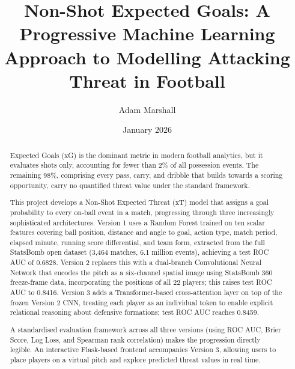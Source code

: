 \documentclass{article}
\title{Non-Shot Expected Goals: A Progressive Machine Learning Approach to Modelling Attacking Threat in Football}
\author{Adam Marshall}
\date{January 2026}
\begin{document}
\maketitle

\begin{abstract}
Expected Goals (xG) is the dominant metric in modern football analytics, but it evaluates shots only, accounting for fewer than 2\% of all possession events. The remaining 98\%, comprising every pass, carry, and dribble that builds towards a scoring opportunity, carry no quantified threat value under the standard framework.

This project develops a Non-Shot Expected Threat (xT) model that assigns a goal probability to every on-ball event in a match, progressing through three increasingly sophisticated architectures. Version 1 uses a Random Forest trained on ten scalar features covering ball position, distance and angle to goal, action type, match period, elapsed minute, running score differential, and team form, extracted from the full StatsBomb open dataset (3,464 matches, 6.1 million events), achieving a test ROC AUC of 0.6828. Version 2 replaces this with a dual-branch Convolutional Neural Network that encodes the pitch as a six-channel spatial image using StatsBomb 360 freeze-frame data, incorporating the positions of all 22 players; this raises test ROC AUC to 0.8416. Version 3 adds a Transformer-based cross-attention layer on top of the frozen Version 2 CNN, treating each player as an individual token to enable explicit relational reasoning about defensive formations; test ROC AUC reaches 0.8459.

A standardised evaluation framework across all three versions (using ROC AUC, Brier Score, Log Loss, and Spearman rank correlation) makes the progression directly legible. An interactive Flask-based frontend accompanies Version 3, allowing users to place players on a virtual pitch and explore predicted threat values in real time.
\end{abstract}
\end{document}
